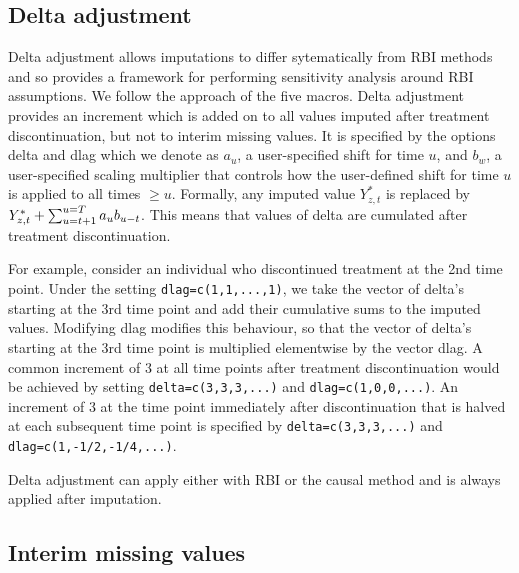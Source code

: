 \subsection{Delta adjustment}

Delta adjustment allows imputations to differ sytematically from RBI methods and so provides a framework for performing sensitivity analysis around RBI assumptions.
We follow the approach of the five macros. 
Delta adjustment provides an increment which is added on to all values imputed after treatment discontinuation, but not to interim missing values. 
It is specified by the options delta and dlag which we denote as $a_u$, a user-specified shift for time $u$, and $b_w$, a user-specified scaling multiplier that controls how the user-defined shift for time $u$ is applied to all times $\ge u$.
Formally, any imputed value $Y^*_{z,t}$ is replaced by $Y^*_{z,t} + \sum_{u=t+1}^{u=T} a_u b_{u-t}$.
This means that values of delta are cumulated after treatment discontinuation. 

For example, consider an individual who discontinued treatment at the 2nd time point. 
Under the setting \texttt{dlag=c(1,1,...,1)}, we take the vector of delta’s starting at the 3rd time point and add their cumulative sums to the imputed values. 
Modifying dlag modifies this behaviour, so that the vector of delta’s starting at the 3rd time point is multiplied elementwise by the vector dlag. 
A common increment of 3 at all time points after treatment discontinuation would be achieved by setting \texttt{delta=c(3,3,3,...)} and \texttt{dlag=c(1,0,0,...)}.
An increment of 3 at the time point immediately after discontinuation that is halved at each subsequent time point is specified by  \texttt{delta=c(3,3,3,...)} and \texttt{dlag=c(1,-1/2,-1/4,...)}.


Delta adjustment can apply either with RBI or the causal method and is always applied after imputation.

\subsection{Interim missing values}

